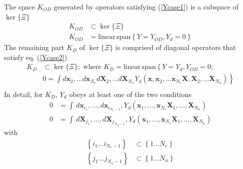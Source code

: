 \documentclass[aps,preprint]{revtex4}%
\begin{document}
The space $K_{OD}$ generated by operators satisfying (\ref{Ycase1}) is a
subspace of $\ker\{\Xi\}$
\begin{align}
K_{OD}  &  \subset\ker\{\Xi\}\nonumber\\
K_{OD}  &  =\mathrm{linear\,span}\left\{  Y=Y_{OD},Y_{d}=0\right\}
\label{koddefn}%
\end{align}
The remaining part $K_{D}$ of $\ker\{\Xi\}$ is comprised of diagonal operators
that satisfy eq. (\ref{Ycase2})
\begin{align}
K_{D}  &  \subset\ker\{\Xi\};\text{ where }K_{D}=\mathrm{linear\,span}\left\{
Y=Y_{d},Y_{OD}=0;\right. \nonumber\\
&  \left.  0=\int d\mathbf{x}_{2},\ldots d\mathbf{x}_{N_{e}}d\mathbf{X}%
_{2},\ldots d\mathbf{X}_{N_{n}}Y_{d}(\mathbf{x},\mathbf{x}_{2},\ldots
\mathbf{x}_{N_{e}}\mathbf{X},\mathbf{X}_{2},\ldots\mathbf{X}_{N_{n}})\right\}
\nonumber\\
&  \label{kddefn}%
\end{align}
In detail, for $K_{D}$, $Y_{d}$ obeys at least one of the two conditions
\begin{align}
0  &  =\int\,d\mathbf{x}_{i_{1}},\ldots,d\mathbf{x}_{i_{N_{e}-1}}%
,Y_{d}(\mathbf{x}_{1},\ldots,\mathbf{x}_{N_{e}}\mathbf{X}_{1},\ldots
,\mathbf{X}_{N_{n}})\nonumber\\
0  &  =\int\,d\mathbf{X}_{j_{1}},\ldots,d\mathbf{X}_{j_{N_{n}-1}}%
,Y_{d}(\mathbf{x}_{1},\ldots,\mathbf{x}_{N_{e}}\mathbf{X}_{1},\ldots
,\mathbf{X}_{N_{n}}) \label{kddefn1}%
\end{align}
with
\begin{align}
\left\{  i_{1}\ldots i_{N_{e}-1}\right\}   &  \subset\left\{  1\ldots
N_{e}\right\} \nonumber\\
\left\{  j_{1}\ldots j_{N_{n}-1}\right\}   &  \subset\left\{  1\ldots
N_{n}\right\}  \label{indices}%
\end{align}
\end{document}
